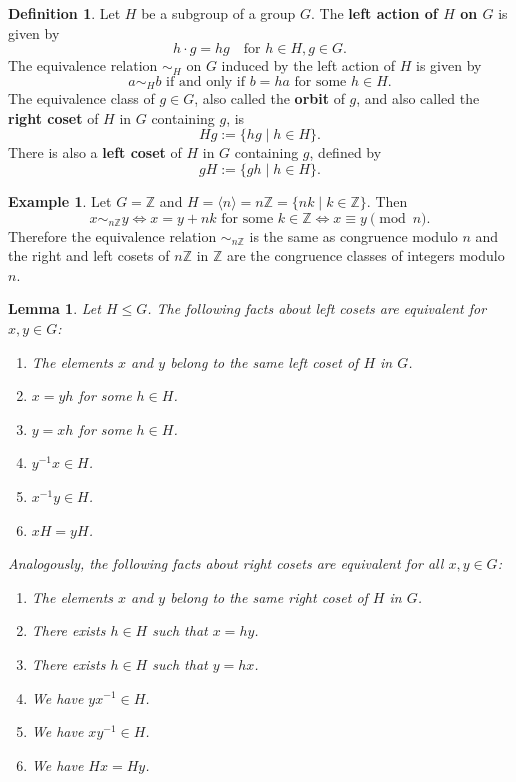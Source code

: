 \documentclass[12pt]{report}
\newtheorem{lemma}[theorem]{Lemma}
\numberwithin{equation}{section}
\numberwithin{theorem}{chapter}
\theoremstyle{definition}
\newtheorem{definition}[theorem]{Definition}
\newtheorem{example}[theorem]{Example}
\newtheorem*{basic properties}{Basic Properties}
\newtheorem*{Important Remark}{Important Remark}
\begin{document}
\begin{definition}
 Let $H$ be a subgroup of a group $G$. The {\bf left action of $H$ on $G$} is given by 
 $$h\cdot g=hg \quad \textrm{for } h\in H, g\in G.$$ 
 The equivalence relation $\sim_H$ on $G$ induced by the left action of $H$ is given by 
 $$a \sim_H b \textrm{ if and only if } b = ha \text{ for some } h \in H.$$ 
 The equivalence class of $g \in G$, also called the {\bf orbit} of $g$, and also called the {\bf right coset} of $H$ in $G$ containing $g$, is
 $$Hg := \{hg \mid h \in H\}.$$ 
 There is also a {\bf left coset} of $H$ in $G$ containing $g$, defined by
 $$gH := \{gh \mid h \in H\}.$$ 
\end{definition}


\begin{example}
Let $G=\mathbb{Z}$ and $H=\langle n\rangle=n\mathbb{Z}=\{nk \mid k\in \mathbb{Z}\}$. Then 
$$x\sim_{ n\mathbb{Z}} y \iff x=y+nk \textrm{ for some } k\in \mathbb{Z} \iff x\equiv y \!\!\!\!\pmod n.$$ 
Therefore the equivalence relation $\sim_{ n\mathbb{Z}}$ is the same as congruence modulo $n$ and the right and left cosets of $n\mathbb{Z}$ in $\mathbb{Z}$ are the congruence classes of integers modulo $n$. 
\end{example}




\begin{lemma}\label{cosets}
Let $H \leq G$. The following facts about left cosets are equivalent for $x,y \in G$:

\vspace{-0.5em}
\begin{enumerate}[label=\arabic*.,leftmargin=15pt,itemsep=-0.1em]
\item The elements $x$ and $y$ belong to the same left coset of $H$ in $G$.
\item $x = yh$ for some $h \in H$.
\item $y = xh$ for some $h \in H$.
\item $y^{-1}x \in H$.
\item $x^{-1}y \in H$.
\item $xH = yH$.
\end{enumerate}

\vspace{-0.5em}

Analogously, the following facts about right cosets are equivalent for all $x,y \in G$:
\begin{enumerate}[label=\arabic*.,leftmargin=15pt,itemsep=-0.1em]
\item The elements $x$ and $y$ belong to the same right coset of $H$ in $G$.
\item There exists $h \in H$ such that $x = hy$.
\item There exists $h \in H$ such that $y = hx$.
\item We have $yx^{-1} \in H$.
\item We have $xy^{-1} \in H$.
\item We have $Hx = Hy$.
\end{enumerate}
\end{lemma}
\end{document}

